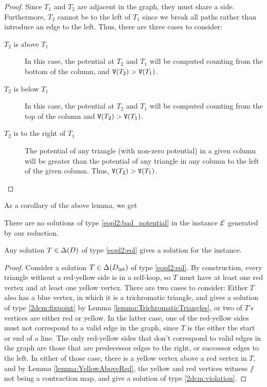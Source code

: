  \begin{proof}
    Since $T_1$ and $T_2$ are adjacent in the \EOPL graph, they must share a side. Furthermore, $T_2$ cannot be to the left of $T_1$ since we break all paths rather than introduce an edge to the left. Thus, there are three cases to consider:
    \begin{description}
    \item[$T_2$ is above $T_1$] In this case, the potential at $T_2$ and $T_1$ will be computed counting from the bottom of the column, and $\operatorname{\texttt{V}}(T_2) > \operatorname{\texttt{V}}(T_1)$.
    \item[$T_2$ is below $T_1$] In this case, the potential at $T_2$ and $T_1$ will be computed counting from the top of the column and $\operatorname{\texttt{V}}(T_2) > \operatorname{\texttt{V}}(T_1)$. 
    \item[$T_2$ is to the right of $T_1$] The potential of any triangle (with non-zero potential) in a given column will be greater than the potential of any triangle in any column to the left of the given column. Thus, $\operatorname{\texttt{V}}(T_2) > \operatorname{\texttt{V}}(T_1)$.
    \end{description}
  \end{proof}

  As a corollary of the above lemma, we get

  \begin{corollary} \label{coro:BadPotentialGiveViolations}
    There are no solutions of type \ref{eopl2:bad_potential} in the instance $\mbox{${\mathcal E}$}$ generated by our reduction.
  \end{corollary}

  \begin{lemma} \label{lemma:EndOfLineSolutions}
    Any solution $T \in \Delta(D)$ of type \ref{eopl2:eol} gives a solution for the \TwoDContractionMap instance.
  \end{lemma}
  \begin{proof}
     Consider a solution $T \in \Delta(D_{\mathrm{int}})$ of type \ref{eopl2:eol}. By construction, every triangle without a red-yellow side is in a self-loop, so $T$ must have at least one red vertex and at least one yellow vertex. There are two cases to consider: Either $T$ also has a blue vertex, in which it is a trichromatic triangle, and gives a solution of type \ref{2dcm:fixpoint} by Lemma \ref{lemma:TrichromaticTriangles}, or two of $T$'s vertices are either red or yellow. In the latter case, one of the red-yellow sides must not correspond to a valid edge in the graph, since $T$ is the either the start or end of a line. The only red-yellow sides that don't correspond to valid edges in the graph are those that are predecessor edges to the right, or successor edges to the left. In either of those case, there is a yellow vertex above a red vertex in $T$, and by Lemma \ref{lemma:YellowAboveRed}, the yellow and red vertices witness $f$ not being a contraction map, and give a solution of type \ref{2dcm:violation}.
    \end{proof}
    
